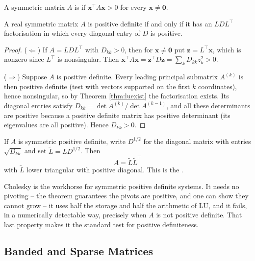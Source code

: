 \documentclass[a4paper]{scrartcl}
\begin{document}
\begin{definition}
  A symmetric matrix $A$ is  if $\mathbf{x}^\top A\mathbf{x} > 0$ for every $\mathbf{x}\neq \mathbf{0}$.
\end{definition}

\begin{theorem}\label{thm:posdef}
  A real symmetric matrix $A$ is positive definite if and only if it has an $LDL^\top$ factorisation in which every diagonal entry of $D$ is positive.
\end{theorem}
\begin{proof}
  ($\Leftarrow$) If $A = LDL^\top$ with $D_{kk} > 0$, then for $\mathbf{x}\neq\mathbf{0}$ put $\mathbf{z} = L^\top\mathbf{x}$, which is nonzero since $L^\top$ is nonsingular. Then $\mathbf{x}^\top A\mathbf{x} = \mathbf{z}^\top D\mathbf{z} = \sum_k D_{kk}z_k^2 > 0$.

  ($\Rightarrow$) Suppose $A$ is positive definite. Every leading principal submatrix $A^{(k)}$ is then positive definite (test with vectors supported on the first $k$ coordinates), hence nonsingular, so by Theorem \ref{thm:luexist} the factorisation exists. Its diagonal entries satisfy $D_{kk} = \det A^{(k)}/\det A^{(k-1)}$, and all these determinants are positive because a positive definite matrix has positive determinant (its eigenvalues are all positive). Hence $D_{kk} > 0$.
\end{proof}

\begin{definition}
  If $A$ is symmetric positive definite, write $D^{1/2}$ for the diagonal matrix with entries $\sqrt{D_{kk}}$ and set $\tilde L = LD^{1/2}$. Then
  $$
  A = \tilde L\tilde L^\top
  $$
  with $\tilde L$ lower triangular with positive diagonal. This is the .
\end{definition}

Cholesky is the workhorse for symmetric positive definite systems. It needs no pivoting -- the theorem guarantees the pivots are positive, and one can show they cannot grow -- it uses half the storage and half the arithmetic of LU, and it fails, in a numerically detectable way, precisely when $A$ is not positive definite. That last property makes it the standard test for positive definiteness.

\subsection{Banded and Sparse Matrices}
\end{document}
